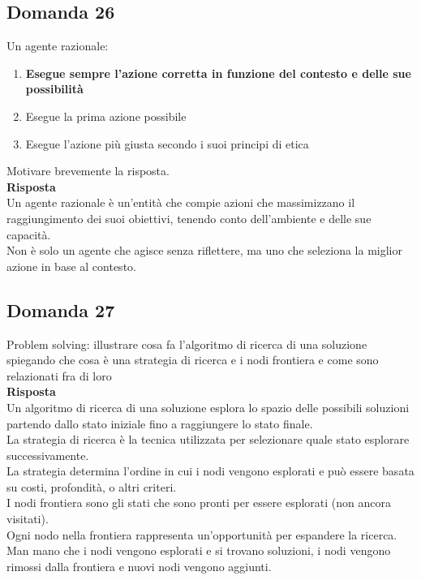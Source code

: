 \documentclass[../main.tex]{subfiles}
\begin{document}
	\subsection{Domanda 26}
	Un agente razionale:
	\begin{enumerate}
		\item \textbf{Esegue sempre l’azione corretta in funzione del contesto e delle sue possibilità}
		\item Esegue la prima azione possibile
		\item Esegue l’azione più giusta secondo i suoi principi di etica
	\end{enumerate}
	Motivare brevemente la risposta.\\
	\textbf{Risposta}\\
	Un agente razionale è un'entità che compie azioni che massimizzano il raggiungimento dei suoi obiettivi, tenendo conto dell'ambiente e delle sue capacità.\\
	Non è solo un agente che agisce senza riflettere, ma uno che seleziona la miglior azione in base al contesto.
	\subsection{Domanda 27}
	Problem solving: illustrare cosa fa l’algoritmo di ricerca di una soluzione spiegando che cosa è una strategia di ricerca e i nodi frontiera e come sono relazionati fra di loro\\
	\textbf{Risposta}\\
	Un algoritmo di ricerca di una soluzione esplora lo spazio delle possibili soluzioni partendo dallo stato iniziale fino a raggiungere lo stato finale.\\
	La strategia di ricerca è la tecnica utilizzata per selezionare quale stato esplorare successivamente. \\
	La strategia determina l'ordine in cui i nodi vengono esplorati e può essere basata su costi, profondità, o altri criteri.\\
	I nodi frontiera sono gli stati che sono pronti per essere esplorati (non ancora visitati). \\
	Ogni nodo nella frontiera rappresenta un'opportunità per espandere la ricerca. \\
	Man mano che i nodi vengono esplorati e si trovano soluzioni, i nodi vengono rimossi dalla frontiera e nuovi nodi vengono aggiunti.
\end{document}
